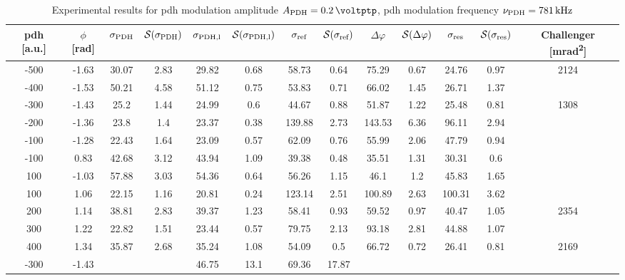 \begin{landscape}
	\begin{table}
	\centering
	\begin{tabular}{|c|c|c|c|c|c|c|c|c|c|c|c|c|}
		\hline
		\gls{pdh} [a.u.] & $\phi$ [\si{\radian}] & $\sigma_{\text{PDH}}$ & $\mathcal{S}(\sigma_{\text{PDH}})$ & $\sigma_{\text{PDH,l}}$ & $\mathcal{S}(\sigma_{\text{PDH,l}})$  & $\sigma_{\text{ref}}$ & $\mathcal{S}(\sigma_{\text{ref}})$ & $\Delta \varphi$ & $\mathcal{S}(\Delta \varphi)$ & $\sigma_{\text{res}}$  & $\mathcal{S}(\sigma_{\text{res}})$ & Challenger [\si{\milli\radian\squared}] \\
		\hline
		\hline
		-500 & -1.63 & 30.07 & 2.83 & 29.82 & 0.68 & 58.73 & 0.64 & 75.29 & 0.67 & 24.76 & 0.97 & 2124\\
		-400 & -1.53 & 50.21 & 4.58 & 51.12 & 0.75 & 53.83 & 0.71 & 66.02 & 1.45 & 26.71 & 1.37 & \\
		-300 & -1.43 & 25.2 & 1.44 & 24.99 & 0.6 & 44.67 & 0.88 & 51.87 & 1.22 & 25.48 & 0.81 & 1308\\
		-200 & -1.36 & 23.8 & 1.4 & 23.37 & 0.38 & 139.88 & 2.73 & 143.53 & 6.36 & 96.11 & 2.94 & \\
		-100 & -1.28 & 22.43 & 1.64 & 23.09 & 0.57 & 62.09 & 0.76 & 55.99 & 2.06 & 47.79 & 0.94 & \\
		-100 & 0.83 & 42.68 & 3.12 & 43.94 & 1.09 & 39.38 & 0.48 & 35.51 & 1.31 & 30.31 & 0.6 & \\
		100 & -1.03 & 57.88 & 3.03 & 54.36 & 0.64 & 56.26 & 1.15 & 46.1 & 1.2 & 45.83 & 1.65 & \\
		100 & 1.06 & 22.15 & 1.16 & 20.81 & 0.24 & 123.14 & 2.51 & 100.89 & 2.63 & 100.31 & 3.62 & \\
		200 & 1.14 & 38.81 & 2.83 & 39.37 & 1.23 & 58.41 & 0.93 & 59.52 & 0.97 & 40.47 & 1.05 & 2354\\
		300 & 1.22 & 22.82 & 1.51 & 23.44 & 0.57 & 79.75 & 2.13 & 93.18 & 2.81 & 44.88 & 1.07 & \\
		400 & 1.34 & 35.87 & 2.68 & 35.24 & 1.08 & 54.09 & 0.5 & 66.72 & 0.72 & 26.41 & 0.81 & 2169\\
		\hline
		\hline
		-300 & -1.43 & & & 46.75 & 13.1 & 69.36 & 17.87 & & & & & \\
		\hline
	\end{tabular}
	\caption{Experimental results for \gls{pdh} modulation amplitude $\tind{A}{PDH} = \SI{0.2}{\voltptp}$, \gls{pdh} modulation frequency $\nu_{\text{PDH}} = \SI{781}{\kilo\hertz}$}
	\end{table}
	
	

\end{landscape}
